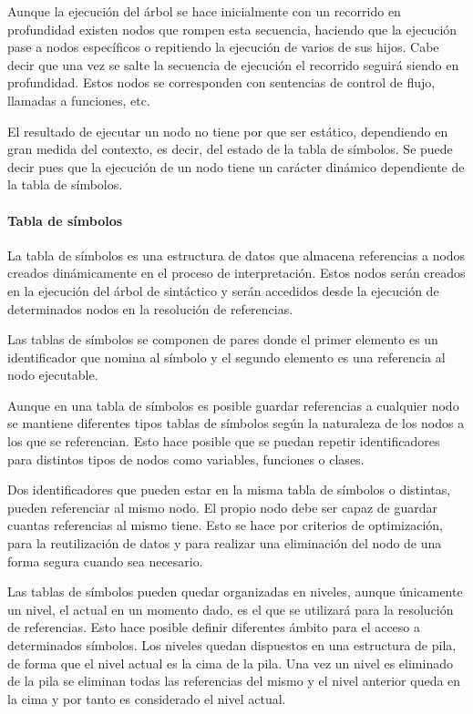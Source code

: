 Aunque la ejecución del árbol se hace inicialmente con un recorrido en profundidad existen nodos que rompen esta secuencia, haciendo que la ejecución pase a nodos específicos 
o repitiendo la ejecución de varios de sus hijos. Cabe decir que una vez se salte la secuencia de ejecución el recorrido seguirá siendo en profundidad. Estos nodos 
se corresponden con sentencias de control de flujo, llamadas a funciones, etc.

El resultado de ejecutar un nodo no tiene por que ser estático, dependiendo en gran medida del contexto, es decir, del estado de la tabla de símbolos. Se puede decir pues que la 
ejecución de un nodo tiene un carácter dinámico dependiente de la tabla de símbolos.

\paragraph{Tabla de símbolos}
La tabla de símbolos es una estructura de datos que almacena referencias a nodos creados dinámicamente en el proceso de interpretación. Estos nodos serán creados en la 
ejecución del árbol de sintáctico y serán accedidos desde la ejecución de determinados nodos en la resolución de referencias. 

Las tablas de símbolos se componen de pares donde el primer elemento es un identificador que nomina al símbolo y el segundo elemento es una referencia al nodo ejecutable. 

Aunque en una tabla de símbolos es posible guardar referencias a cualquier nodo se mantiene diferentes tipos tablas de símbolos según la naturaleza de los nodos a los que se
referencian. Esto hace posible que se puedan repetir identificadores para distintos tipos de nodos como variables, funciones o clases.

Dos identificadores que pueden estar en la misma tabla de símbolos o distintas, pueden referenciar al mismo nodo. El propio nodo debe ser capaz de guardar cuantas referencias al 
mismo tiene. Esto se hace por criterios de optimización, para la reutilización de datos y para realizar una eliminación del nodo de una forma segura cuando sea necesario.

Las tablas de símbolos pueden quedar organizadas en niveles, aunque únicamente un nivel, el actual en un momento dado, es el que se utilizará para la resolución de referencias.
Esto hace posible definir diferentes ámbito para el acceso a determinados símbolos. Los niveles quedan dispuestos en una estructura de pila, de forma que el nivel actual es
la cima de la pila. Una vez un nivel es eliminado de la pila se eliminan todas las referencias del mismo y el nivel anterior queda en la cima y por tanto es considerado el nivel actual.


